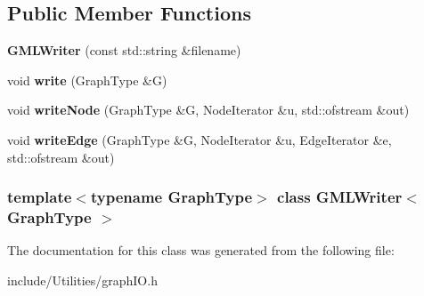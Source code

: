 \subsection*{Public Member Functions}
\begin{DoxyCompactItemize}
\item 
\hypertarget{class_g_m_l_writer_a19db959ea12789add9fffddd7afb13f1}{
{\bfseries GMLWriter} (const std::string \&filename)}
\label{class_g_m_l_writer_a19db959ea12789add9fffddd7afb13f1}

\item 
\hypertarget{class_g_m_l_writer_ae15206dda668538fc5c67ff6b738c909}{
void {\bfseries write} (GraphType \&G)}
\label{class_g_m_l_writer_ae15206dda668538fc5c67ff6b738c909}

\item 
\hypertarget{class_g_m_l_writer_acd7f811a5c65e6b9824299e8fa71ba46}{
void {\bfseries writeNode} (GraphType \&G, NodeIterator \&u, std::ofstream \&out)}
\label{class_g_m_l_writer_acd7f811a5c65e6b9824299e8fa71ba46}

\item 
\hypertarget{class_g_m_l_writer_ad856f3921f79020190dac407e795e2a6}{
void {\bfseries writeEdge} (GraphType \&G, NodeIterator \&u, EdgeIterator \&e, std::ofstream \&out)}
\label{class_g_m_l_writer_ad856f3921f79020190dac407e795e2a6}

\end{DoxyCompactItemize}
\subsubsection*{template$<$typename GraphType$>$ class GMLWriter$<$ GraphType $>$}



The documentation for this class was generated from the following file:\begin{DoxyCompactItemize}
\item 
include/Utilities/graphIO.h\end{DoxyCompactItemize}
